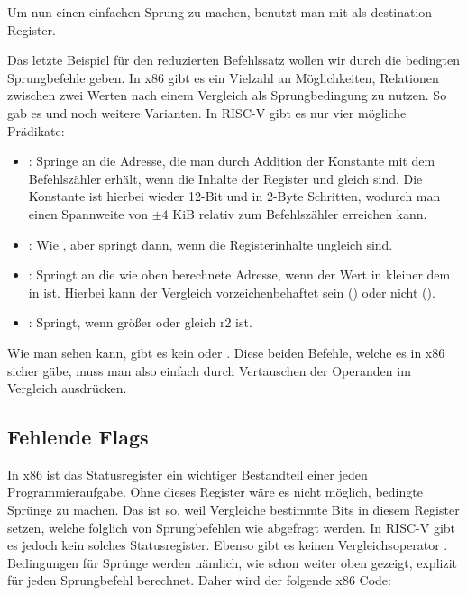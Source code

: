Um nun einen einfachen Sprung zu machen, benutzt man  mit  als
destination Register.

Das letzte Beispiel für den reduzierten Befehlssatz wollen wir durch die
bedingten Sprungbefehle geben. In x86 gibt es ein Vielzahl an Möglichkeiten,
Relationen zwischen zwei Werten nach einem Vergleich als Sprungbedingung zu
nutzen. So gab es  und noch weitere Varianten. In
RISC-V gibt es nur vier mögliche Prädikate:

\begin{itemize}
  \item {}: Springe an die Adresse, die man durch
    Addition der Konstante  mit dem Befehlszähler erhält, wenn
    die Inhalte der Register  und  gleich sind. Die Konstante
    ist hierbei wieder 12-Bit und in 2-Byte Schritten, wodurch man einen
    Spannweite von $\pm 4$ KiB relativ zum Befehlszähler erreichen kann.
  \item {}: Wie , aber springt dann, wenn
    die Registerinhalte ungleich sind.
  \item {}: Springt an die wie oben berechnete
    Adresse, wenn der Wert in  kleiner dem in  ist. Hierbei
    kann der Vergleich vorzeichenbehaftet sein () oder nicht
    ().
  \item {}: Springt, wenn  größer oder
    gleich r2 ist.
\end{itemize}

Wie man sehen kann, gibt es kein  oder . Diese beiden
Befehle, welche es in x86 sicher gäbe, muss man also einfach durch Vertauschen
der Operanden im Vergleich ausdrücken.

\subsection{Fehlende Flags}

In x86 ist das Statusregister ein wichtiger Bestandteil einer jeden
Programmieraufgabe. Ohne dieses Register wäre es nicht möglich, bedingte Sprünge
zu machen. Das ist so, weil Vergleiche bestimmte Bits in diesem Register setzen,
welche folglich von Sprungbefehlen wie  abgefragt werden. In RISC-V
gibt es jedoch kein solches Statusregister. Ebenso gibt es keinen
Vergleichsoperator . Bedingungen für Sprünge werden nämlich, wie schon
weiter oben gezeigt, explizit für jeden Sprungbefehl berechnet. Daher wird der
folgende x86 Code:

